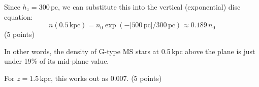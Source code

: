 Since $h_z = 300\,\mathrm{pc}$, we can substitute this into the vertical
(exponential) disc equation:
\[
  n(0.5\,\mathrm{kpc}) = n_0 \exp(-\left|500\,\mathrm{pc}\right|/300\,\mathrm{pc})
  \approx 0.189\,n_0
\]
\hfill(5 points)

In other words, the density of G-type MS stars at 0.5\,kpc above the plane is
just under 19\% of its mid-plane value.

For $z = 1.5\,\mathrm{kpc}$, this works out as $0.007$. \hfill(5 points)
